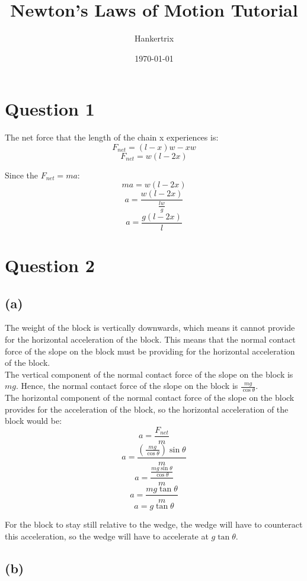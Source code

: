 \documentclass[11pt]{article}
\author{Hankertrix}
\date{\today}
\title{Newton's Laws of Motion Tutorial}
\begin{document}
\maketitle
\setcounter{tocdepth}{2}
\tableofcontents

\newpage

\section{Question 1}
\label{sec:org606c7bf}
The net force that the length of the chain x experiences is:
\[F_{net} = (l-x)w - xw\]
\[F_{net} = w(l-2x)\]

Since the \(F_{net} = ma\):
\[ma = w(l-2x)\]
\[a = \frac{w(l-2x)}{\frac{lw}{g}}\]
\[a = \frac{g(l-2x)}{l}\]

\section{Question 2}
\label{sec:orgafb6b97}

\subsection{(a)}
\label{sec:orgbfab878}
The weight of the block is vertically downwards, which means it cannot provide for the horizontal acceleration of the block. This means that the normal contact force of the slope on the block must be providing for the horizontal acceleration of the block.
\\[0pt]

The vertical component of the normal contact force of the slope on the block is \(mg\). Hence, the normal contact force of the slope on the block is \(\frac{mg}{\cos \theta}\).
\\[0pt]

The horizontal component of the normal contact force of the slope on the block provides for the acceleration of the block, so the horizontal acceleration of the block would be:
\[a = \frac{F_{net}}{m}\]
\[a = \frac{\left(\frac{mg}{\cos \theta} \right) \sin \theta}{m}\]
\[a = \frac{\frac{mg \sin \theta}{\cos \theta}}{m}\]
\[a = \frac{mg \tan \theta}{m}\]
\[a = g \tan \theta\]

For the block to stay still relative to the wedge, the wedge will have to counteract this acceleration, so the wedge will have to accelerate at \(g \tan \theta\).

\subsection{(b)}
\label{sec:org75fd73c}
\end{document}
